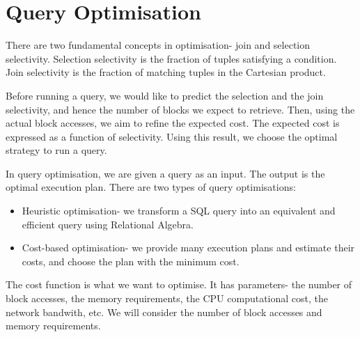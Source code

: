 \documentclass[a4paper, openany]{memoir}
\theoremstyle{definition}
\theoremstyle{plain}
\begin{document}
\newpage

\section{Query Optimisation}
There are two fundamental concepts in optimisation- join and selection selectivity. Selection selectivity is the fraction of tuples satisfying a condition. Join selectivity is the fraction of matching tuples in the Cartesian product.

Before running a query, we would like to predict the selection and the join selectivity, and hence the number of blocks we expect to retrieve. Then, using the actual block accesses, we aim to refine the expected cost. The expected cost is expressed as a function of selectivity. Using this result, we choose the optimal strategy to run a query.

In query optimisation, we are given a query as an input. The output is the optimal execution plan. There are two types of query optimisations:
\begin{itemize}
    \item Heuristic optimisation- we transform a SQL query into an equivalent and efficient query using Relational Algebra.
    \item Cost-based optimisation- we provide many execution plans and estimate their costs, and choose the plan with the minimum cost.
\end{itemize}
The cost function is what we want to optimise. It has parameters- the number of block accesses, the memory requirements, the CPU computational cost, the network bandwith, etc. We will consider the number of block accesses and memory requirements. 
\end{document}
